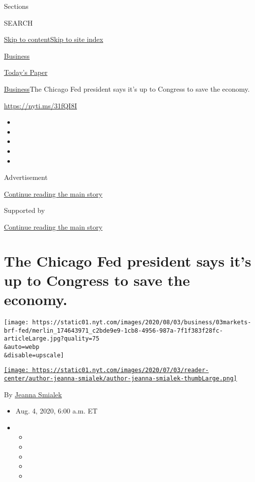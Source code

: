 Sections

SEARCH

\protect\hyperlink{site-content}{Skip to
content}\protect\hyperlink{site-index}{Skip to site index}

\href{https://www.nytimes.com/section/business}{Business}

\href{https://myaccount.nytimes.com/auth/login?response_type=cookie\&client_id=vi}{}

\href{https://www.nytimes.com/section/todayspaper}{Today's Paper}

\href{/section/business}{Business}\textbar{}The Chicago Fed president
says it's up to Congress to save the economy.

\url{https://nyti.ms/31fQI8I}

\begin{itemize}
\item
\item
\item
\item
\item
\end{itemize}

Advertisement

\protect\hyperlink{after-top}{Continue reading the main story}

Supported by

\protect\hyperlink{after-sponsor}{Continue reading the main story}

\hypertarget{the-chicago-fed-president-says-its-up-to-congress-to-save-the-economy}{%
\section{The Chicago Fed president says it's up to Congress to save the
economy.}\label{the-chicago-fed-president-says-its-up-to-congress-to-save-the-economy}}

\texttt{[image: https://static01.nyt.com/images/2020/08/03/business/03markets-brf-fed/merlin\_174643971\_c2bde9e9-1cb8-4956-987a-7f1f383f28fc-articleLarge.jpg?quality=75\\\&auto=webp\\\&disable=upscale]}

\href{https://www.nytimes.com/by/jeanna-smialek}{\texttt{[image: https://static01.nyt.com/images/2020/07/03/reader-center/author-jeanna-smialek/author-jeanna-smialek-thumbLarge.png]}}

By \href{https://www.nytimes.com/by/jeanna-smialek}{Jeanna Smialek}

\begin{itemize}
\item
  Aug. 4, 2020, 6:00 a.m. ET
\item
  \begin{itemize}
  \item
  \item
  \item
  \item
  \item
  \end{itemize}
\end{itemize}

